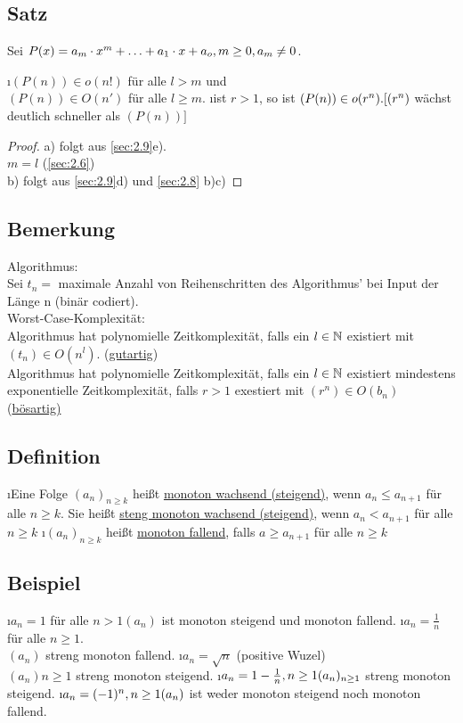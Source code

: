 \subsection[Satz: Landausymbole bei Polynomen]{Satz}
Sei $P(x) = a_m \cdot x^m + \ldots + a_1 \cdot x + a_o, m \geq 0, a_m \not = 0$.
\begin{enumerate}[a)]
\i $(P(n)) \in o(n!)$ für alle $l>m$ und\\
$(P(n)) \in O(n')$ für alle $l \geq m$.
\i ist $r > 1$, so ist $(P(n)) \in o(r^n).\\
\lbrack(r^n)$ wächst deutlich schneller als $(P(n))\rbrack$
\begin{proof}
a) folgt aus \ref{sec:2.9}e).\\
$m = l$ (\ref{sec:2.6})\\
b) folgt aus \ref{sec:2.9}d) und \ref{sec:2.8} b)c)
\end{proof}
\end{enumerate}
\subsection{Bemerkung}
Algorithmus:\\
Sei $t_n =$ maximale Anzahl von Reihenschritten des Algorithmus' bei Input der Länge n (binär codiert).\\
Worst-Case-Komplexität:\\
Algorithmus hat polynomielle Zeitkomplexität, falls ein $l \in \mathbb{N}$ existiert mit $(t_n) \in O(n^l)$. (\underline{gutartig})\\
Algorithmus hat polynomielle Zeitkomplexität, falls ein $l \in \mathbb{N}$ existiert mindestens exponentielle Zeitkomplexität, falls 
$ r > 1$ exestiert mit $(r^n) \in O(b_n)$ (\underline{bösartig)}
\subsection{Definition}\label{sec:2.18}
\begin{enumerate}[a)]
\i Eine Folge $(a_n)_{n \geq k}$ hei\ss t \underline{monoton wachsend (steigend)}, wenn $a_n \leq a_{n+1}$ f\"ur alle $n \geq k$. Sie hei\ss t \underline{steng monoton wachsend (steigend)}, wenn $a_n < a_{n+1}$ f\"ur alle $n \geq k$
\i $(a_n)_{n \geq k}$ hei\ss t \underline{monoton fallend}, falls $a \geq a_{n+1}$ f\"ur alle $n \geq k$
\end{enumerate}
\subsection{Beispiel}
\begin{enumerate}[a)]
\i $a_n = 1$ f\"ur alle $n > 1
(a_n)$ ist monoton steigend und monoton fallend.
\i $a_n = \frac{1}{n}$ f\"ur alle $n \geq 1$.\\
$(a_n)$ streng monoton fallend.
\i $a_n = \sqrt{n}$ (positive Wuzel)\\
$(a_n){n \geq 1}$ streng monoton steigend.
\i $a_n = 1 - \frac{1}{n}, n \geq 1\\
(a_n)_{n \geq 1}$ streng monoton steigend.
\i $a_n = (-1)^n, n \geq 1\\
(a_n)$ ist weder monoton steigend noch monoton fallend.
\end{enumerate}
